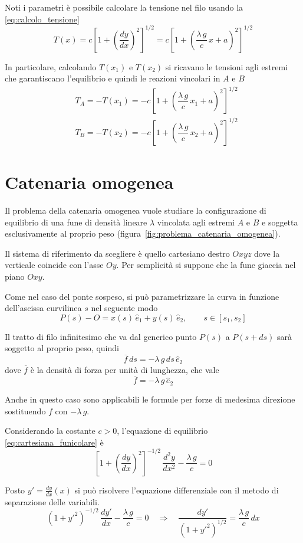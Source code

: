 Noti i parametri è possibile calcolare la tensione nel filo usando la \eqref{eq:calcolo_tensione}
\[
 T(x) = c\left[1+\left(\dfrac{dy}{dx}\right)^2\right]^{1/2} = c\left[1+\left(\dfrac{\lambda\,g}{c}\,x + a\right)^2\right]^{1/2}
\]

In particolare, calcolando $T(x_1)$ e $T(x_2)$ si ricavano le tensioni agli estremi che garantiscano l'equilibrio e quindi le reazioni vincolari in $A$ e $B$
\begin{align*}
 &T_A = -T(x_1) = -c\left[1+\left(\dfrac{\lambda\,g}{c}\,x_1 + a\right)^2\right]^{1/2}\\
 &T_B = -T(x_2) = -c\left[1+\left(\dfrac{\lambda\,g}{c}\,x_2 + a\right)^2\right]^{1/2}
 \end{align*}
 
 \section{Catenaria omogenea}
 
 Il problema della catenaria omogenea vuole studiare la configurazione di equilibrio di una fune di densità lineare $\lambda$ vincolata agli estremi $A$ e $B$ e soggetta esclusivamente al proprio peso (figura~\ref{fig:problema_catenaria_omogenea}). 
 
 Il sistema di riferimento da scegliere è quello cartesiano destro $Oxyz$ dove la verticale coincide con l'asse $Oy$. Per semplicità si suppone che la fune giaccia nel piano $Oxy$.
 
 Come nel caso del ponte sospeso, si può parametrizzare la curva in funzione dell'ascissa curvilinea $s$ nel seguente modo
 \[
  P(s) - O = x(s)\,\hat{e}_1 + y(s)\,\hat{e}_2,\qquad s\in[s_1, s_2]
 \]
 
Il tratto di filo infinitesimo che va dal generico punto $P(s)$ a $P(s+ds)$ sarà soggetto al proprio peso, quindi
\[
 \overline{f}\,ds = -\lambda\,g\,ds\,\hat{e}_2
\]
dove $\overline{f}$ è la densità di forza per unità di lunghezza, che vale
\[
 \overline{f} = -\lambda\,g\,\hat{e}_2
\]

Anche in questo caso sono applicabili le formule per forze di medesima direzione sostituendo $f$ con $-\lambda\,g$.

Considerando la costante $c>0$, l'equazione di equilibrio \eqref{eq:cartesiana_funicolare} è
\[
 \left[1+\left(\dfrac{dy}{dx}\right)^2\right]^{-1/2}\,\dfrac{d^2y}{dx^2} - \dfrac{\lambda\,g}{c} = 0
\]

Posto $y' = \frac{dy}{dx}(x)$ si può risolvere l'equazione differenziale con il metodo di separazione delle variabili.
\[
 \left(1+y'^2\right)^{-1/2}\,\dfrac{dy'}{dx} - \dfrac{\lambda\,g}{c} = 0 \quad \Longrightarrow\quad \dfrac{dy'}{\left(1+y'^2\right)^{1/2}} = \dfrac{\lambda\,g}{c}\,dx
\]

